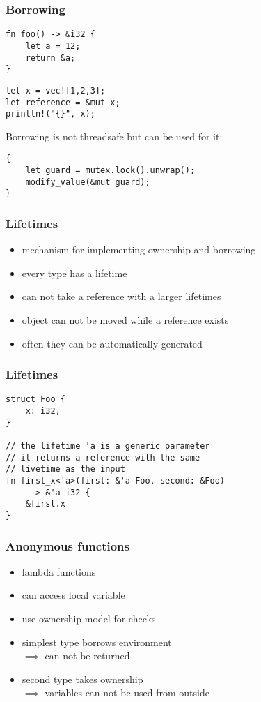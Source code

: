 \documentclass[xcolor=colortbl
]{beamer}
\begin{document}
\begin{frame}[fragile]
    \frametitle{Borrowing}

\begin{lstlisting}[frame=single]
fn foo() -> &i32 {
    let a = 12;
    return &a;
}
\end{lstlisting}

\begin{lstlisting}[frame=single]
let x = vec![1,2,3];
let reference = &mut x;
println!("{}", x);
\end{lstlisting}

Borrowing is not threadsafe but can be used for it:
\begin{lstlisting}[frame=single]
{
    let guard = mutex.lock().unwrap();
    modify_value(&mut guard);
}
\end{lstlisting}

\end{frame}




\begin{frame}
    \frametitle{Lifetimes}
    
    \begin{itemize}
        \item mechanism for implementing ownership and borrowing
        \item every type has a lifetime
        \item can not take a reference with a larger lifetimes
        \item object can not be moved while a reference exists
        \item often they can be automatically generated
    \end{itemize}
\end{frame}

\begin{frame}[fragile]
    \frametitle{Lifetimes}
\begin{lstlisting}[frame=single]
struct Foo {
    x: i32,
}

// the lifetime 'a is a generic parameter
// it returns a reference with the same 
// livetime as the input
fn first_x<'a>(first: &'a Foo, second: &Foo)
     -> &'a i32 {
    &first.x
}
\end{lstlisting}
\end{frame}


\begin{frame}
    \frametitle{Anonymous functions}
    
    \begin{itemize}
        \item lambda functions
        \item can access local variable
        \item use ownership model for checks
        \item simplest type borrows environment
        \\ $\implies$ can not be returned
        \item second type takes ownership
        \\ $\implies$ variables can not be used from outside
    \end{itemize}
\end{frame}
\end{document}

